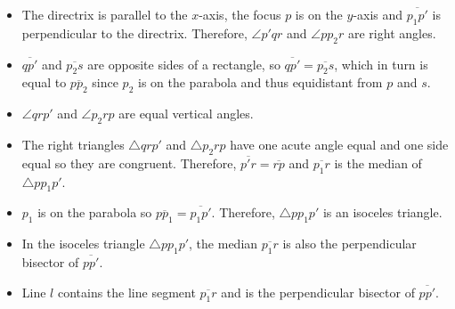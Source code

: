 \begin{itemize}
\item The directrix is parallel to the $x$-axis, the focus $p$ is on the $y$-axis and $\overline{p_1p'}$ is perpendicular to the directrix. Therefore, $\angle p'qr$ and $\angle pp_2r$ are right angles.
\item $\overline{qp'}$ and $\overline{p_2s}$ are opposite sides of a rectangle, so $\overline{qp'}=\overline{p_2s}$, which in turn is equal to $\overline{pp_2}$ since $p_2$ is on the parabola and thus equidistant from $p$ and $s$.
\item $\angle qrp'$ and $\angle p_2rp$ are equal vertical angles.
\item The right triangles $\triangle qrp'$ and $\triangle p_2rp$ have one acute angle equal and one side equal so they are congruent. Therefore, $\overline{p'r}=\overline{rp}$ and $\overline{p_1r}$ is the median of $\triangle pp_1p'$.
\item $p_1$ is on the parabola so $\overline{pp_1}=\overline{p_1p'}$. Therefore, $\triangle pp_1p'$ is an isoceles triangle.
\item In the isoceles triangle $\triangle pp_1p'$, the median $\overline{p_1r}$ is also the perpendicular bisector of $\overline{pp'}$.
\item Line $l$ contains the line segment $\overline{p_1r}$ and is the perpendicular bisector of $\overline{pp'}$.
\end{itemize}

